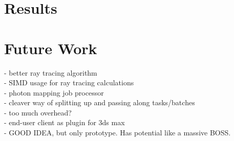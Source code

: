 \chapter{Results}

\chapter{Future Work}

- better ray tracing algorithm\\
- SIMD usage for ray tracing calculations\\
- photon mapping job processor\\
- cleaver way of splitting up and passing along tasks/batches\\
- too much overhead?\\
- end-user client as plugin for 3ds max\\
- GOOD IDEA, but only prototype. Has potential like a massive BOSS.

